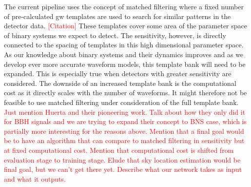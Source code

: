 The current pipeline uses the concept of matched filtering where a fixed number of pre-calculated \gls{gw} templates are used to search for similar patterns in the detector data. \textcolor{red}{[Citation]} These templates cover some area of the parameter space of binary systems we expect to detect. The sensitivity, however, is directly connected to the spacing of templates in this high dimensional parameter space. As our knowledge about binary systems and their dynamics improves and as we develop ever more accurate waveform models, this template bank will need to be expanded. This is especially true when detectors with greater sensitivity are considered. The downside of an increased template bank is the computational cost as it directly scales with the number of waveforms. It might therefore not be feasible to use matched filtering under consideration of the full template bank.
\textcolor{red}{Just mention Huerta and their pioneering work. Talk about how they only did it for BBH signals and we are trying to expand their concept to BNS case, which is partially more interesting for the reasons above. Mention that a final goal would be to have an algorithm that can compare to matched filtering in sensitivity but at fixed computational cost. Mention that computational cost is shifted from evaluation stage to training stage. Elude that sky location estimation would be final goal, but we can't get there yet. Describe what our network takes as input and what it outputs.}
